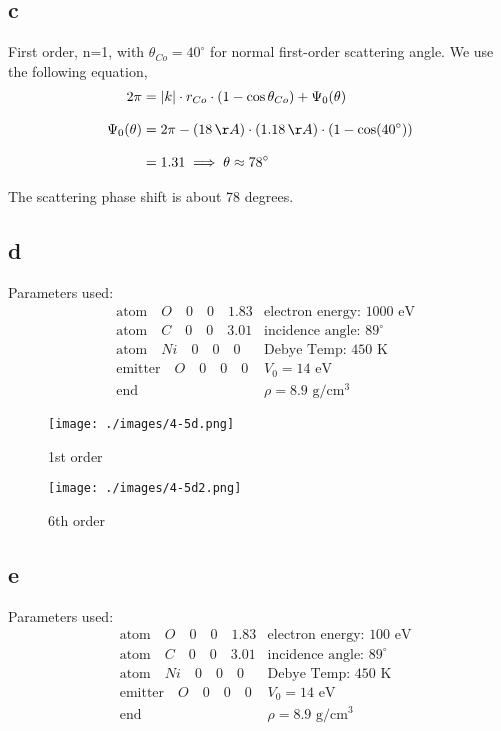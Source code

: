 \documentclass[12pt]{article}
\renewcommand{\=}[1]{\stackrel{#1}{=}} %
\theoremstyle{definition}
\theoremstyle{remark}
\begin{document}
\subsection*{c}
First order, n=1, with $\theta_{Co} = 40^\circ$ for normal first-order scattering angle. We use the following equation,
\begin{align*}
2\pi &= |k|\cdot r_{Co}\cdot \left(1-\cos\theta_{Co}\right) +\Psi_0(\theta)\\[3mm]
\Psi_0(\theta) &= 2\pi - (18\,\AA)\cdot(1.18\,\AA)\cdot(1-\cos(40^\circ))\\[3mm]
	&= 1.31 \implies \theta \approx 78^\circ
\end{align*}

The scattering phase shift is about 78 degrees.

\subsection*{d}
Parameters used:
\begin{align*}
&\text{atom}\quad O\quad 0\quad 0\quad 1.83 &\text{electron energy: } 1000\,\,\text{eV}\\[2mm]
&\text{atom}\quad C\quad 0\quad 0\quad 3.01 &\text{incidence angle: } 89^\circ\\[2mm]
&\text{atom}\quad Ni\quad 0\quad 0\quad 0   &\text{Debye Temp: } 450\,\,\text{K}\\[2mm]
&\text{emitter}\quad O\quad 0\quad 0\quad 0 &V_0= 14\,\,\text{eV}\\[2mm]
&\text{end} 								&\rho= 8.9\,\,\text{g/cm$^3$}
\end{align*}

\begin{figure}[H]
\centering
\texttt{[image: ./images/4-5d.png]}
\caption{1st order}
\label{4-5d}
\end{figure}

\begin{figure}[H]
\centering
\texttt{[image: ./images/4-5d2.png]}
\caption{6th order}
\label{4-5d2}
\end{figure}

\subsection*{e}
Parameters used:
\begin{align*}
&\text{atom}\quad O\quad 0\quad 0\quad 1.83 &\text{electron energy: } 100\,\,\text{eV}\\[2mm]
&\text{atom}\quad C\quad 0\quad 0\quad 3.01 &\text{incidence angle: } 89^\circ\\[2mm]
&\text{atom}\quad Ni\quad 0\quad 0\quad 0   &\text{Debye Temp: } 450\,\,\text{K}\\[2mm]
&\text{emitter}\quad O\quad 0\quad 0\quad 0 &V_0= 14\,\,\text{eV}\\[2mm]
&\text{end} 								&\rho= 8.9\,\,\text{g/cm$^3$}
\end{align*}
\end{document}
